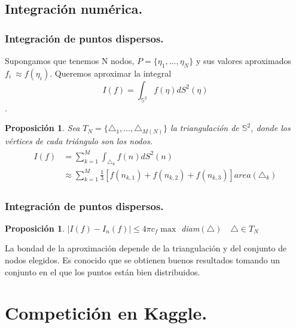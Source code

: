 \documentclass{beamer}
\theoremstyle{plain}
\theoremstyle{definition}
\theoremstyle{plain}
\newtheorem{prop}[thm]{Proposici\'{o}n}
\theoremstyle{definition}
\theoremstyle{remark}
\theoremstyle{definition}
\begin{document}
\subsection{Integración numérica.}
\begin{frame}
	\tableofcontents[currentsection,currentsubsection,sections=1]
\end{frame}
\begin{frame}
	\frametitle{Integración de puntos dispersos.}
	Supongamos que tenemos N nodos, $P=\{\eta_1,...,\eta_N\}$ y sus valores aproximados $f_i~\approx f(\eta_i)$. Queremos aproximar la integral $$I(f) =  \int_{\mathds{S}^2} f(\eta)dS^2(\eta)$$.
	\begin{prop}
		Sea $T_N=\{\triangle_1,...,\triangle_{M(N)}\}$ la triangulación de $\mathds{S}^2$, donde los vértices de cada triángulo son los nodos.
		\begin{gather*}
		\begin{aligned}
			I(f) &= \sum_{k=1}^{M} \int_{\triangle_k} f(n)dS^2(n) \\& \approx  \sum_{k=1}^{M} \frac{1}{3}[f(n_{k,1})+f(n_{k,2})+f(n_{k,3})] area(\triangle_k)
		\end{aligned}
		\end{gather*}
	\end{prop}
\end{frame}
\begin{frame}
		\frametitle{Integración de puntos dispersos.}
		\begin{prop}
			$|I(f)-I_n(f)|\le 4\pi c_f \max$ diam$(\triangle) \quad \triangle\in T_N$
		\end{prop}
	La bondad de la aproximación depende de la triangulación y del conjunto de nodos elegidos.
	Es conocido que se obtienen buenos resultados tomando un conjunto en el que los puntos están bien distribuidos.

\end{frame}
\section{Competición en Kaggle.}
\end{document}
